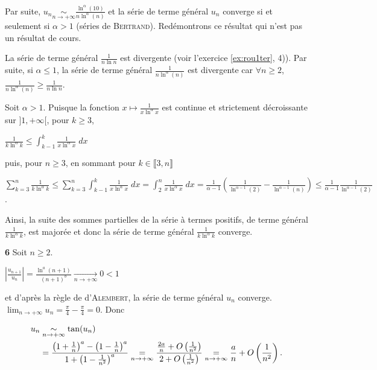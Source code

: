 {{Par suite, $u_n\underset{n\rightarrow+\infty}{\sim}\frac{\ln^\alpha(10)}{n\ln^\alpha(n)}$ et la série de terme général $u_n$ converge si et seulement si $\alpha> 1$ (séries de \textsc{Bertrand}). Redémontrons ce résultat qui n'est pas un résultat de cours.

La série de terme général $\frac{1}{n\ln n}$ est divergente (voir l'exercice \ref{ex:rou1ter}, 4)). Par suite, si $\alpha\leqslant1$, la série de terme général $\frac{1}{n\ln^\alpha(n)}$ est divergente car $\forall n\geqslant2$, $\frac{1}{n\ln^\alpha(n)}\geqslant\frac{1}{n\ln n}$.

Soit $\alpha>1$. Puisque la fonction $x\mapsto\frac{1}{x\ln^\alpha x}$ est continue et strictement décroissante sur $]1,+\infty[$, pour $k\geqslant3$,

\begin{center}
$\frac{1}{k\ln^\alpha k}\leqslant\int_{k-1}^{k}\frac{1}{x\ln^\alpha x}\;dx$
\end{center}

puis, pour $n\geqslant3$, en sommant pour $k\in\llbracket3,n\rrbracket$

\begin{center}
$\sum_{k=3}^{n}\frac{1}{k\ln^\alpha k}\leqslant\sum_{k=3}^{n}\int_{k-1}^{k}\frac{1}{x\ln^\alpha x}\;dx=\int_{2}^{n}\frac{1}{x\ln^\alpha x}\;dx=\frac{1}{\alpha-1}\left(\frac{1}{\ln^{\alpha-1}(2)}-\frac{1}{\ln^{\alpha-1}(n)}\right)\leqslant\frac{1}{\alpha-1}\frac{1}{\ln^{\alpha-1}(2)}$.
\end{center}

Ainsi, la suite des sommes partielles de la série à termes positifs, de terme général $\frac{1}{k\ln^\alpha k}$, est majorée et donc la série de terme général $\frac{1}{k\ln^\alpha k}$ converge.

\textbf{6} Soit $n\geqslant2$.

\begin{center}
$\left|\frac{u_{n+1}}{u_n}\right|=\frac{\ln^a(n+1)}{(n+1)^b}\underset{n\rightarrow+\infty}{\rightarrow}0 < 1$
\end{center}

et d'après la règle de d'\textsc{Alembert}, la série de terme général $u_n$ converge.
$\lim_{n \rightarrow +\infty}u_n=\frac{\pi}{4}-\frac{\pi}{4}= 0$. Donc

\begin{align*}\ensuremath
u_n&\underset{n\rightarrow+\infty}{\sim}\tan(u_n)\\
 &=\frac{\left(1+\frac{1}{n}\right)^a-\left(1-\frac{1}{n}\right)^a}{1+\left(1-\frac{1}{n^2}\right)^a}\underset{n\rightarrow+\infty}{=}\frac{\frac{2a}{n}+O\left(\frac{1}{n^2}\right)}{2+O\left(\frac{1}{n^2}\right)}\underset{n\rightarrow+\infty}{=}\frac{a}{n}+O\left(\frac{1}{n^2}\right).
\end{align*}

}}
